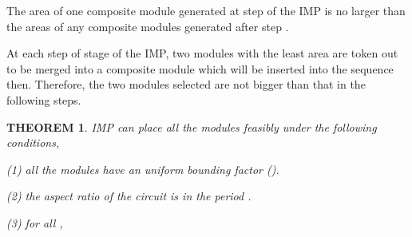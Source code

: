 \documentclass[conference]{IEEEtran}
\begin{document}
\begin{lemma}
The area of one composite module generated at step  of the IMP is no larger than the areas of any composite modules generated after step .
\end{lemma}

At each step of stage \uppercase \expandafter {} of the IMP, two modules with the least area are token out to be merged into a composite module which will be inserted into the sequence then. Therefore, the two modules selected are not bigger than that in the following steps.


\newtheorem{theorem}{THEOREM}
\begin{theorem} IMP can place all the modules feasibly under the following conditions,

(1) all the modules have an uniform bounding factor  ().

(2) the aspect ratio of the circuit  is in the period .

(3) for all ,
   

\end{theorem}
\end{document}
